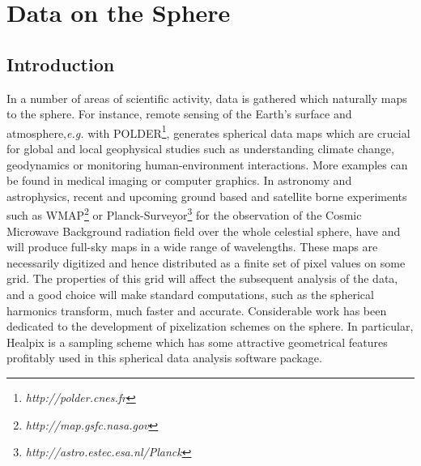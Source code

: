 
\chapter{Data on the Sphere}
\label{ch_intro}

\section{Introduction}

In a number of areas of scientific activity, data is gathered which naturally maps to the sphere. For instance, remote sensing of the 
Earth's surface and atmosphere,\emph{e.g.} with POLDER\footnote{\emph{http://polder.cnes.fr}}, generates spherical data maps which are 
crucial for global and local geophysical studies such as understanding climate change, geodynamics or monitoring human-environment 
interactions. More examples can be found in medical imaging or computer graphics. In astronomy and astrophysics, recent and upcoming 
ground based and satellite borne experiments such as WMAP\footnote{\emph{http://map.gsfc.nasa.gov}} or Planck-Surveyor\footnote{\emph{http://astro.estec.esa.nl/Planck}} 
for the observation of the Cosmic Microwave Background radiation field over the whole celestial sphere, have and will produce full-sky 
maps in a wide range of wavelengths. These maps are necessarily digitized and hence distributed as a finite set of pixel values on some 
grid. The properties of this grid will affect the subsequent analysis of the data, and a good choice will make standard computations, 
such as the spherical harmonics transform, much faster and accurate. Considerable work has been dedicated to the development of 
pixelization schemes on the sphere. In particular, Healpix\cite{healpix} is a sampling scheme which has some attractive geometrical 
features profitably used in this spherical data analysis software package. \\

